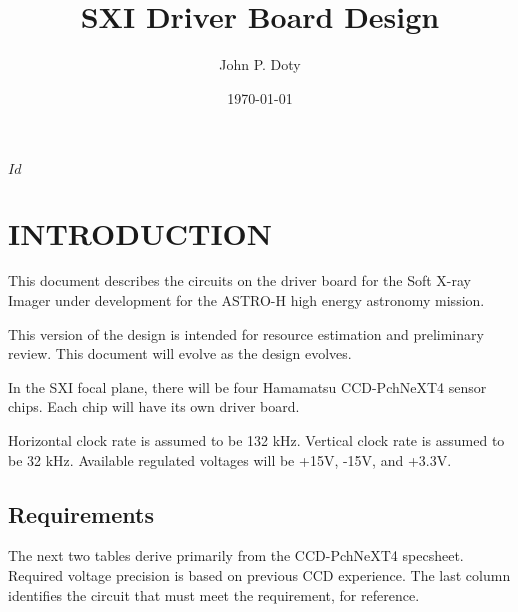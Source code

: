 \documentclass[a4paper,12pt]{article}
\author{John P. Doty}
\date{\today}
\title{SXI Driver Board Design}
\begin{document}
\begin{titlepage}
\maketitle
\centering
$Id$
\end{titlepage} 

\section{INTRODUCTION}
This document describes the circuits on the driver board for the Soft X-ray Imager under development for the ASTRO-H high energy astronomy mission.

This version of the design is intended for resource estimation and preliminary review. This document will evolve as the design evolves.

In the SXI focal plane, there will be four Hamamatsu CCD-PchNeXT4 sensor chips. Each chip will have its own driver board. 

Horizontal clock rate is assumed to be 132 kHz. Vertical clock rate is assumed to be 32 kHz. Available regulated voltages will be +15V, -15V, and +3.3V. 


\subsection{Requirements}
The next two tables derive primarily from the CCD-PchNeXT4 specsheet. Required voltage precision is based on previous CCD experience. The last column identifies the circuit that must meet the requirement, for reference.
\end{document}
